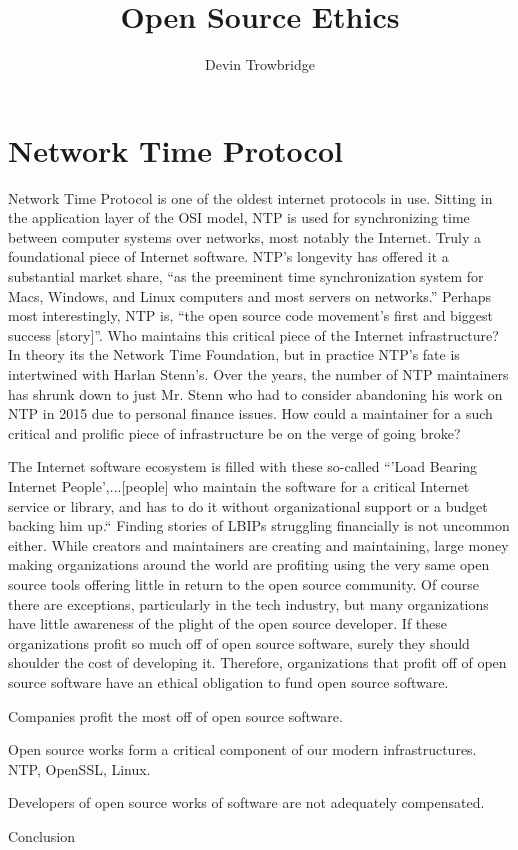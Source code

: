 \documentclass[format=sigconf]{acmart}
\title{Open Source Ethics}
\author{Devin Trowbridge}
\affiliation{%
  \department{Computer Science and Software Engineering}
  \institution{Auburn University}
  \email{dkt0003@auburn.edu}
  \city{Huntsville}
  \state{Alabama}
  \country{United States}
}
\begin{document}
\maketitle

\section{Network Time Protocol}

Network Time Protocol is one of the oldest internet protocols in use. Sitting in the application layer of the OSI model, NTP is used for synchronizing time between computer systems over networks, most notably the Internet. Truly a foundational piece of Internet software. NTP's longevity has offered it a substantial market share, ``as the preeminent time synchronization system for Macs, Windows, and Linux computers and most servers on networks.'' \cite{ntp} Perhaps most interestingly, NTP is, ``the open source code movement's first and biggest success [story]''. \cite{ntp} Who maintains this critical piece of the Internet infrastructure? In theory its the Network Time Foundation, but in practice NTP's fate is intertwined with Harlan Stenn's. Over the years, the number of NTP maintainers has shrunk down to just Mr. Stenn who had to consider abandoning his work on NTP in 2015 due to personal finance issues. How could a maintainer for a such critical and prolific piece of infrastructure be on the verge of going broke?

The Internet software ecosystem is filled with these so-called ``'Load Bearing Internet People',...[people] who maintain the software for a critical Internet service or library, and has to do it without organizational support or a budget backing him up.`` \cite{lbip} Finding stories of LBIPs struggling financially is not uncommon either. While creators and maintainers are creating and maintaining, large money making organizations around the world are profiting using the very same open source tools offering little in return to the open source community. Of course there are exceptions, particularly in the tech industry, but many organizations have little awareness of the plight of the open source developer. If these organizations profit so much off of open source software, surely they should shoulder the cost of developing it. Therefore, organizations that profit off of open source software have an ethical obligation to fund open source software.

Companies profit the most off of open source software. \cite{gartner} 

Open source works form a critical component of our modern infrastructures. NTP, OpenSSL, Linux. \cite{ford}

Developers of open source works of software are not adequately compensated. 

Conclusion

\medskip



\end{document}

